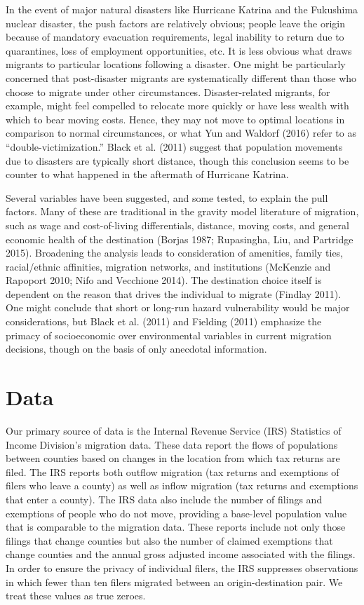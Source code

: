 \documentclass[]{article}
\begin{document}
In the event of major natural disasters like Hurricane Katrina and the
Fukushima nuclear disaster, the push factors are relatively obvious;
people leave the origin because of mandatory evacuation requirements,
legal inability to return due to quarantines, loss of employment
opportunities, etc. It is less obvious what draws migrants to particular
locations following a disaster. One might be particularly concerned that
post-disaster migrants are systematically different than those who
choose to migrate under other circumstances. Disaster-related migrants,
for example, might feel compelled to relocate more quickly or have less
wealth with which to bear moving costs. Hence, they may not move to
optimal locations in comparison to normal circumstances, or what Yun and
Waldorf (2016) refer to as ``double-victimization.'' Black et al. (2011)
suggest that population movements due to disasters are typically short
distance, though this conclusion seems to be counter to what happened in
the aftermath of Hurricane Katrina.

Several variables have been suggested, and some tested, to explain the
pull factors. Many of these are traditional in the gravity model
literature of migration, such as wage and cost-of-living differentials,
distance, moving costs, and general economic health of the destination
(Borjas 1987; Rupasingha, Liu, and Partridge 2015). Broadening the
analysis leads to consideration of amenities, family ties, racial/ethnic
affinities, migration networks, and institutions (McKenzie and Rapoport
2010; Nifo and Vecchione 2014). The destination choice itself is
dependent on the reason that drives the individual to migrate (Findlay
2011). One might conclude that short or long-run hazard vulnerability
would be major considerations, but Black et al. (2011) and Fielding
(2011) emphasize the primacy of socioeconomic over environmental
variables in current migration decisions, though on the basis of only
anecdotal information.

\section{\texorpdfstring{Data \label{data}}{Data }}\label{data}

Our primary source of data is the Internal Revenue Service (IRS)
Statistics of Income Division's migration data. These data report the
flows of populations between counties based on changes in the location
from which tax returns are filed. The IRS reports both outflow migration
(tax returns and exemptions of filers who leave a county) as well as
inflow migration (tax returns and exemptions that enter a county). The
IRS data also include the number of filings and exemptions of people who
do not move, providing a base-level population value that is comparable
to the migration data. These reports include not only those filings that
change counties but also the number of claimed exemptions that change
counties and the annual gross adjusted income associated with the
filings. In order to ensure the privacy of individual filers, the IRS
suppresses observations in which fewer than ten filers migrated between
an origin-destination pair. We treat these values as true zeroes.
\end{document}
